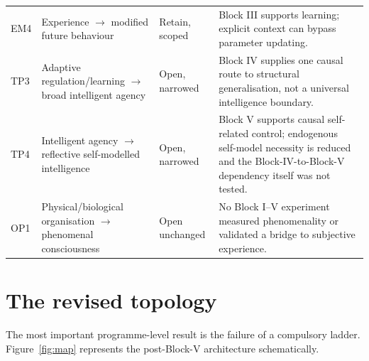 \documentclass[11pt,a4paper]{article}
\begin{document}
\begin{longtable}{p{.08\linewidth}p{.28\linewidth}p{.20\linewidth}p{.34\linewidth}}
EM4 & Experience $\rightarrow$ modified future behaviour & Retain, scoped & Block III supports learning; explicit context can bypass parameter updating.\\
TP3 & Adaptive regulation/learning $\rightarrow$ broad intelligent agency & Open, narrowed & Block IV supplies one causal route to structural generalisation, not a universal intelligence boundary.\\
TP4 & Intelligent agency $\rightarrow$ reflective self-modelled intelligence & Open, narrowed & Block V supports causal self-related control; endogenous self-model necessity is reduced and the Block-IV-to-Block-V dependency itself was not tested.\\
OP1 & Physical/biological organisation $\rightarrow$ phenomenal consciousness & Open unchanged & No Block I--V experiment measured phenomenality or validated a bridge to subjective experience.\\
\bottomrule
\end{longtable}
\normalsize

\section{The revised topology}

The most important programme-level result is the failure of a compulsory ladder. Figure~\ref{fig:map} represents the post-Block-V architecture schematically.
\end{document}
